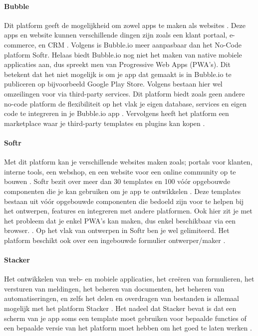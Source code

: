 \paragraph{Bubble}
Dit platform geeft de mogelijkheid om zowel apps te maken als websites \autocite{Youssef2023}. 
Deze apps en website kunnen verschillende dingen zijn zoals een klant portaal, e-commerce, en CRM \autocite{Sharma2022}. 
Volgens \textcite{Youssef2023} is Bubble.io meer aanpasbaar dan het No-Code platform Softr. Helaas biedt Bubble.io nog niet het maken van native mobiele applicaties aan, dus spreekt men van Progressive Web Apps (PWA’s). 
Dit betekent dat het niet mogelijk is om je app dat gemaakt is in Bubble.io te publiceren op bijvoorbeeld Google Play Store. Volgens \textcite{Sharma2022} bestaan hier wel omzeilingen voor via third-party services. Dit platform biedt zoals geen andere no-code platform de flexibiliteit op het vlak je eigen database, services en eigen code te integreren in je Bubble.io app \autocite{Bas2024}. 
Vervolgens heeft het platform een marketplace waar je third-party templates en plugins kan kopen \autocite{Sharma2022}. 
\paragraph{Softr}
Met dit platform kan je verschillende websites maken zoals; portals voor klanten, interne tools, een webshop, en een website voor een online community op te bouwen\autocite{Code2023} \autocite{Youssef2023} .
Softr bezit over meer dan 30 templates en 100 vóór opgebouwde componenten die je kan gebruiken om je app te 
ontwikkelen \autocite{Frater2024} \autocite{Youssef2023}. 
Deze templates bestaan uit vóór opgebouwde componenten die bedoeld zijn voor te helpen bij het ontwerpen, features en integreren met andere platformen. 
Ook hier zit je met het probleem dat je enkel PWA’s kan maken, dus enkel beschikbaar via een browser. \autocite{Frater2024}. 
Op het vlak van ontwerpen in Softr ben je wel gelimiteerd. Het platform beschikt ook over een ingebouwde formulier ontwerper/maker \autocite{Youssef2023}. 

\paragraph{Stacker}
Het ontwikkelen van web- en mobiele applicaties, het creëren van formulieren, het versturen van meldingen, het beheren van documenten, 
het beheren van automatiseringen, en zelfs het delen en overdragen van bestanden is allemaal mogelijk met het platform 
Stacker \autocite{JDN2023}. 
Het nadeel dat Stacker bevat is dat een scherm van je app soms een template moet gebruiken voor bepaalde functies 
of een bepaalde versie van het platform moet hebben om het goed te laten werken \autocite{Advice}.
